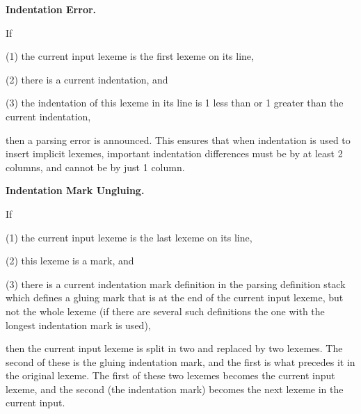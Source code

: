 \documentclass[12pt]{article}
\newenvironment{indpar}[1][0.3in]%
	{\begin{list}{}%
		     {\setlength{\itemsep}{0in}%
		      \setlength{\topsep}{0in}%
		      \setlength{\parsep}{1ex}%
		      \setlength{\labelwidth}{#1}%
		      \setlength{\leftmargin}{#1}%
		      \addtolength{\leftmargin}{\labelsep}}%
	 \item}%
	{\end{list}}
\begin{document}
\begin{indpar}

{\bf Indentation Error.}
\begin{indpar}
If
\begin{list}{}
	     {\setlength{\itemsep}{0ex}%
	      \setlength{\topsep}{0ex}%
	      \setlength{\parsep}{0ex}%
	      \setlength{\leftmargin}{0.5in}%
	      \setlength{\rightmargin}{0.5in}}%
\item[(1)] the current input lexeme is the first lexeme on its line,
\item[(2)] there is a current indentation, and
\item[(3)] the indentation of this lexeme in its line
is 1 less than or 1 greater
than the current indentation,
\end{list}
then a parsing error is announced.
This ensures that when indentation is
used to insert implicit lexemes, important indentation
differences must be by at least
2 columns, and cannot be by just 1 column.
\end{indpar}

{\bf Indentation Mark Ungluing.}%
\begin{indpar}
If
\begin{list}{}
	     {\setlength{\itemsep}{0ex}%
	      \setlength{\topsep}{0ex}%
	      \setlength{\parsep}{0ex}%
	      \setlength{\leftmargin}{0.5in}%
	      \setlength{\rightmargin}{0.5in}}%
\item[(1)] the current input lexeme is the last lexeme on its line,
\item[(2)] this lexeme is a mark, and
\item[(3)] there is a current indentation mark definition in the
parsing definition stack which defines a gluing mark that is
at the end of the current input lexeme, but not the whole lexeme
(if there are several such definitions the one with the longest
indentation mark is used),
\end{list}
then the current input lexeme is split in two and replaced by two lexemes.
The second of these is the gluing indentation mark, and the first
is what precedes it in the original lexeme.  The first of these two
lexemes becomes the current input lexeme, and the second (the
indentation mark) becomes the
next lexeme in the current input.
\end{indpar}


\end{indpar}
\end{document}
